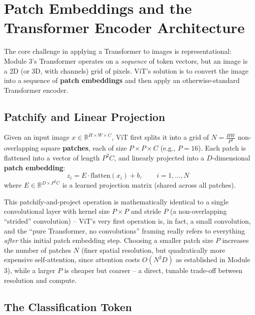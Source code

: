 \documentclass[12pt,a4paper]{article}
\begin{document}
\section{Patch Embeddings and the Transformer Encoder Architecture}

The core challenge in applying a Transformer to images is representational: Module 3's Transformer operates on a \emph{sequence} of token vectors, but an image is a 2D (or 3D, with channels) grid of pixels. ViT's solution is to convert the image into a sequence of \textbf{patch embeddings} and then apply an otherwise-standard Transformer encoder.

\subsection{Patchify and Linear Projection}

\begin{defbox}
Given an input image $x \in \mathbb{R}^{H\times W\times C}$, ViT first splits it into a grid of $N = \frac{HW}{P^2}$ non-overlapping square \textbf{patches}, each of size $P \times P \times C$ (e.g., $P=16$). Each patch is flattened into a vector of length $P^2 C$, and linearly projected into a $D$-dimensional \textbf{patch embedding}:
\[
z_i = E \cdot \text{flatten}(x_i) + b, \qquad i = 1, \ldots, N
\]
where $E \in \mathbb{R}^{D \times P^2C}$ is a learned projection matrix (shared across all patches).
\end{defbox}

\begin{keyidea}
This patchify-and-project operation is mathematically identical to a single convolutional layer with kernel size $P\times P$ and stride $P$ (a non-overlapping ``strided'' convolution) -- ViT's very first operation is, in fact, a small convolution, and the ``pure Transformer, no convolutions'' framing really refers to everything \emph{after} this initial patch embedding step. Choosing a smaller patch size $P$ increases the number of patches $N$ (finer spatial resolution, but quadratically more expensive self-attention, since attention costs $O(N^2D)$ as established in Module 3), while a larger $P$ is cheaper but coarser -- a direct, tunable trade-off between resolution and compute.
\end{keyidea}

\subsection{The Classification Token}
\end{document}

